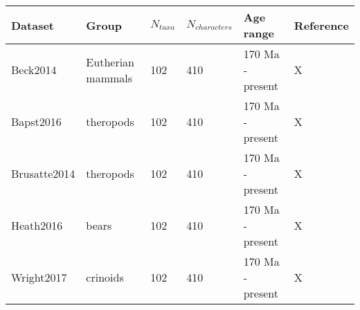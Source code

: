 
\begin{tabular}[t]{l p{3cm} l l l l}		

\hline
\textbf{Dataset} & \textbf{Group} & \textbf{$N_{taxa}$} & \textbf{$N_{characters}$} & \textbf{Age range} & \textbf{Reference} \\
\hline
Beck2014 & Eutherian mammals & 102 & 410 & 170 Ma - present & X \\
Bapst2016 & theropods & 102 & 410 & 170 Ma - present & X \\
Brusatte2014 & theropods & 102 & 410 & 170 Ma - present & X \\
Heath2016 & bears & 102 & 410 & 170 Ma - present & X \\
Wright2017 & crinoids & 102 & 410 & 170 Ma - present & X \\
\hline
\end{tabular}